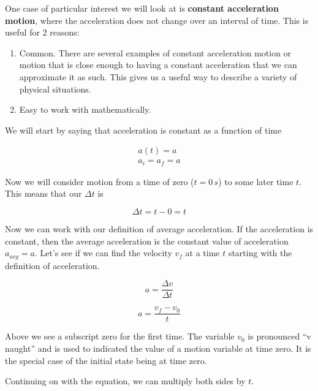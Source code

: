 \documentclass[12pt]{book}
\begin{document}
One case of particular interest we will look at is \textbf{constant acceleration motion}, where the acceleration does not change over an interval of time. This is useful for 2 reasons:

\begin{enumerate}
\item Common. There are several examples of constant acceleration motion or motion that is close enough to having a constant acceleration that we can approximate it as such. This gives us a useful way to describe a variety of physical situations.

\item Easy to work with mathematically.
\end{enumerate}

We will start by saying that acceleration is constant as a function of time

\begin{equation}
\begin{split}
a(t) = a \\
a_i = a_f = a
\end{split}
\end{equation}

Now we will consider motion from a time of zero ($t = 0 \, s$) to some later time $t$. This means that our $\Delta t$ is

\begin{equation}
\Delta t = t - 0 = t
\end{equation}

Now we can work with our definition of average acceleration. If the acceleration is constant, then the average acceleration is the constant value of acceleration $a_{avg} = a$. Let's see if we can find the velocity $v_f$ at a time $t$ starting with the definition of acceleration.

\begin{equation}
a = \frac{\Delta v}{\Delta t}
\end{equation}

\begin{equation}
a = \frac{v_f - v_0}{t}
\end{equation}

Above we see a subscript zero for the first time. The variable $v_0$ is pronounced ``v naught'' and is used to indicated the value of a motion variable at time zero. It is the special case of the initial state being at time zero.

Continuing on with the equation, we can multiply both sides by $t$.
\end{document}
